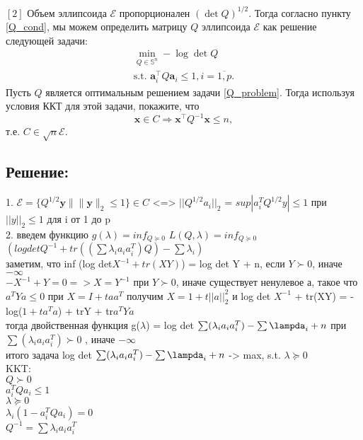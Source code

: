 \documentclass[a4paper,12pt]{article}
\begin{document}
\item $[2]$ Объем эллипсоида $\mathcal{E}$ пропорционален $\left(\det Q\right)^{1/2}.$ Тогда согласно пункту \ref{Q_cond}, мы можем определить матрицу $Q$ эллипсоида 
 $\mathcal{E}$ как решение следующей задачи:
     \begin{equation}
     \label{Q_problem}
        \begin{aligned}
      \min_{Q \in \mathbb{S}^n} -\log\det Q \\
        \text{s.t. } \mathbf{a}_i^\top Q \mathbf{a}_i \leq 1, i=\overline{1,p}.
        \end{aligned}
    \end{equation}
    Пусть $Q$ является оптимальным решением задачи \eqref{Q_problem}. Тогда используя условия ККТ для этой задачи, покажите, что
$$\mathbf{x}\in C \Rightarrow \mathbf{x}^\top Q^{-1} \mathbf{x}\leq n,$$
т.е. $C\in \sqrt{n} \mathcal{E}.$

\subsection*{Решение:}

1. $\mathcal{E}=\{Q^{1/2} \mathbf{y}\| \|\mathbf{y}\|_2\leq 1\} \in C$ <=> $||Q^{1/2}a_i||_2$ = $sup |a_i^TQ^{1/2}y| \leq 1 $ при $||y||_2 \leq 1$ для i от 1 до p\\ 

2. введем функцию $g(\lambda) = inf_{Q \succeq 0}$ $L(Q, \lambda) = inf_{Q \succeq 0}$ $(log det Q^{-1} + tr ((\sum \lambda_i a_i a_i^T)Q) - \sum \lambda_i)$ \\

заметим, что inf (log det$X^{-1} + tr(XY)$) = log det Y + n, если $Y \succ 0$, иначе $- \infty$\\

$-X^{-1}+Y = 0 => X=Y^{-1} $ при $Y \succ 0$, иначе существует ненулевое а, такое что $a^TYa\leq 0 $ при $X = I + taa^T$ получим $X = 1 + t||a||_2^2 $ и log det $X^{-1}$ + tr(XY) = - log($1+ta^Ta$) + trY + tr$a^TYa$ \\

тогда двойственная функция g($\lambda$) = log det $\sum (\lambda_i a_i a_i^T) - \sum \lampda_i + n$ при $\sum (\lambda_i a_i a_i^T) \succ 0$ , иначе $- \infty$\\

итого задача log det $\sum (\lambda_i a_i a_i^T) - \sum \lampda_i + n$ -> max, s.t. $\lambda \succeq 0$ \\

KKT: \\
$Q \succ 0$ \\
$a_i^TQa_i \leq 1 $ \\
$\lambda \succeq 0$ \\
$\lambda_i(1 - a_i^TQa_i ) = 0$ \\
$Q^{-1} = \sum \lambda_i a_i a_i^T$ \\
\end{document}
